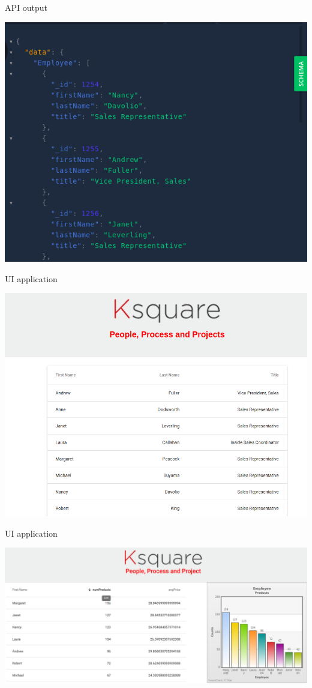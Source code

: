 \documentclass{beamer}
\begin{document}
\begin{frame}{API output}{ }

\begin{center}
	\includegraphics[width=0.7\linewidth]{img/graphqloutput.png}
\end{center}
\end{frame}

\begin{frame}{UI application}{ }

\begin{center}
	\includegraphics[width=0.7\linewidth]{img/reactoutput.png}
\end{center}
\end{frame}

\begin{frame}{UI application}{ }

\begin{center}
	\includegraphics[width=0.7\linewidth]{img/output1.png}
\end{center}
\end{frame}
\end{document}
